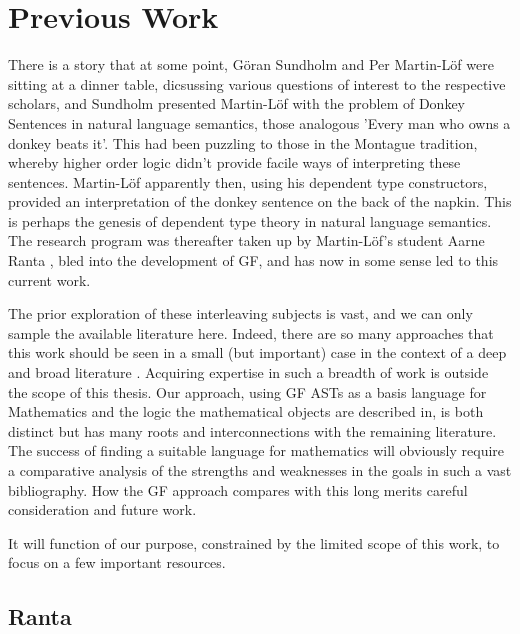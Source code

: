 \section{Previous Work}

There is a story that at some point, Göran Sundholm and Per Martin-Löf were
sitting at a dinner table, dicsussing various questions of interest to the
respective scholars, and Sundholm presented Martin-Löf with the problem of
Donkey Sentences in natural language semantics, those analogous 'Every man who
owns a donkey beats it'. This had been puzzling to those in the Montague
tradition, whereby higher order logic didn't provide facile ways of interpreting
these sentences. Martin-Löf apparently then, using his dependent type
constructors, provided an interpretation of the donkey sentence on the back of
the napkin. This is perhaps the genesis of dependent type theory in natural
language semantics. The research program was thereafter taken up by Martin-Löf's
student Aarne Ranta \cite{ranta1994type}, bled into the development of GF, and
has now in some sense led to this current work.

The prior exploration of these interleaving subjects is vast, and we can only
sample the available literature here. Indeed, there are so many approaches that
this work should be seen in a small (but important) case in the context of a
deep and broad literature \cite{surveyLang}. Acquiring expertise in such a
breadth of work is outside the scope of this thesis. Our approach, using
GF ASTs as a basis language for Mathematics and the logic the mathematical
objects are described in, is both distinct but has many roots and
interconnections with the remaining literature. The success of finding a
suitable language for mathematics will obviously require a comparative analysis
of the strengths and weaknesses in the goals in such a vast bibliography. 
 How the GF approach compares with this long merits careful consideration and
 future work.

It will function of our purpose, constrained by the limited scope of this work,
to focus on a few important resources.

\subsection{Ranta}

